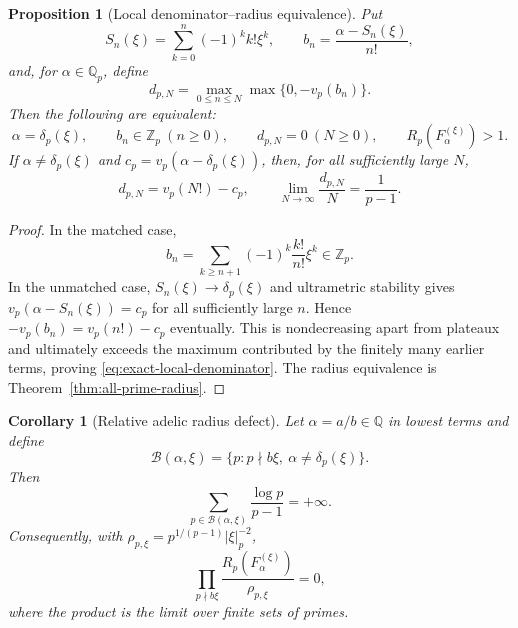 \documentclass[11pt]{article}
\newtheorem{proposition}[theorem]{Proposition}
\newtheorem{corollary}[theorem]{Corollary}
\theoremstyle{definition}
\theoremstyle{remark}
\begin{document}
\begin{proposition}[Local denominator--radius equivalence]
\label{prop:local-denominator-radius}
Put
\[
 S_n(\xi)=\sum_{k=0}^n(-1)^kk!\xi^k,
 \qquad b_n=\frac{\alpha-S_n(\xi)}{n!},
\]
and, for $\alpha\in\mathbb Q_p$, define
\[
 d_{p,N}=\max_{0\leq n\leq N}\max\{0,-v_p(b_n)\}.
\]
Then the following are equivalent:
\begin{equation}
 \alpha=\delta_p(\xi),\qquad
 b_n\in\mathbb Z_p\ (n\geq0),\qquad
 d_{p,N}=0\ (N\geq0),\qquad
 R_p(F_\alpha^{(\xi)})>1.
\label{eq:four-local-equivalences}
\end{equation}
If $\alpha\ne\delta_p(\xi)$ and
$c_p=v_p(\alpha-\delta_p(\xi))$, then, for all sufficiently large $N$,
\begin{equation}
 d_{p,N}=v_p(N!)-c_p,
 \qquad
 \lim_{N\to\infty}\frac{d_{p,N}}N=\frac1{p-1}.
\label{eq:exact-local-denominator}
\end{equation}
\end{proposition}

\begin{proof}
In the matched case,
\[
 b_n=\sum_{k\geq n+1}(-1)^k\frac{k!}{n!}\xi^k\in\mathbb Z_p.
\]
In the unmatched case, $S_n(\xi)\to\delta_p(\xi)$ and ultrametric
stability gives
$v_p(\alpha-S_n(\xi))=c_p$ for all sufficiently large $n$.  Hence
$-v_p(b_n)=v_p(n!)-c_p$ eventually.  This is nondecreasing apart from
plateaux and ultimately exceeds the maximum contributed by the finitely
many earlier terms, proving \eqref{eq:exact-local-denominator}.  The radius
equivalence is Theorem~\ref{thm:all-prime-radius}.
\end{proof}

\begin{corollary}[Relative adelic radius defect]
\label{cor:adelic-radius-defect}
Let $\alpha=a/b\in\mathbb Q$ in lowest terms and define
\[
 \mathcal B(\alpha,\xi)
 =\{p:p\nmid b\xi,\ \alpha\ne\delta_p(\xi)\}.
\]
Then
\begin{equation}
 \sum_{p\in\mathcal B(\alpha,\xi)}\frac{\log p}{p-1}=+\infty.
\label{eq:bad-prime-divergence}
\end{equation}
Consequently, with
$\rho_{p,\xi}=p^{1/(p-1)}|\xi|_p^{-2}$,
\begin{equation}
 \prod_{p\nmid b\xi}
 \frac{R_p(F_\alpha^{(\xi)})}{\rho_{p,\xi}}=0,
\label{eq:relative-adelic-product-zero}
\end{equation}
where the product is the limit over finite sets of primes.
\end{corollary}
\end{document}
